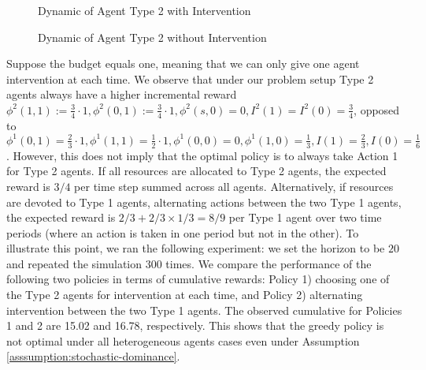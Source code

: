 \begin{figure}[!h]
\centering
{}
\caption{Dynamic of Agent Type 2 with Intervention}
\label{fig:transition-2-1}
\end{figure}
\begin{figure}[!ht]
\centering
{}
\caption{Dynamic of Agent Type 2 without Intervention}
\label{fig:transition-2-0}
\end{figure}

Suppose the budget equals one, meaning that we can only give one agent intervention at each time. 
We observe that under our problem setup Type 2 agents always have a higher incremental reward $\phi^2(1,1):=\frac{3}{4}\cdot 1, \phi^2(0,1):=\frac{3}{4}\cdot 1,\phi^2(s,0)=0,I^2(1)=I^2(0)=\frac{3}{4}$, opposed to $\phi^1(0,1)=\frac{2}{3}\cdot 1,\phi^1(1,1)=\frac{1}{2}\cdot 1,\phi^1(0,0)=0,\phi^1(1,0)=\frac{1}{3}, I(1)=\frac{2}{3},I(0)=\frac{1}{6}$. 
However, this does not imply that the optimal policy is to always take Action 1 for Type 2 agents. If all resources are allocated to Type 2 agents, the expected reward is $3/4$ per time step summed across all agents. Alternatively, if resources are devoted to Type 1 agents, alternating actions between the two Type 1 agents, the expected reward is $2/3 + 2/3 \times 1/3 = 8/9$ per Type 1 agent over two time periods (where an action is taken in one period but not in the other). To illustrate this point, we ran the following experiment:
we set the horizon to be $20$ and repeated the simulation $300$ times. We compare the performance of the following two policies in terms of cumulative rewards: Policy 1) choosing one of the Type 2 agents for intervention at each time, and Policy 2) alternating intervention between the two Type 1 agents. The observed cumulative for Policies 1 and 2 are 15.02 and 16.78, respectively. This shows that the greedy policy is not optimal under all heterogeneous agents cases even under Assumption \ref{asssumption:stochastic-dominance}.
